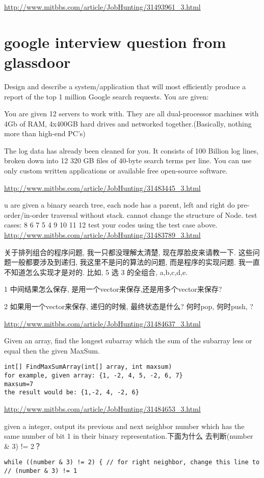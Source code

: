 \documentclass[12pt]{book}
\begin{document}
\url{http://www.mitbbs.com/article/JobHunting/31493961_3.html}
\chapter{google interview question from glassdoor}
\label{sec-16}
Design and describe a system/application that will most efficiently produce 
a report of the top 1 million Google search requests. You are given:

You are given 12 servers to work with. They are all dual-processor machines 
with 4Gb of RAM, 4x400GB hard drives and networked together.(Basically, 
nothing more than high-end PC's)

The log data has already been cleaned for you. It consists of 100 Billion 
log lines, broken down into 12 320 GB files of 40-byte search terms per line.
You can use only custom written applications or available free open-source 
software.

\url{http://www.mitbbs.com/article/JobHunting/31483445_3.html}

u are given a binary search tree,
each node has a parent, left and right
do pre-order/in-order traversal without stack.
cannot change the structure of Node.
test cases: 8  6  7  5  4  9  10  11  12
test your codes using the test case above.
\url{http://www.mitbbs.com/article/JobHunting/31483789_3.html}

关于排列组合的程序问题, 我一只都没理解太清楚, 现在厚脸皮来请教一下. 这些问题一般都要涉及到递归, 我这里不是问的算法的问题, 而是程序的实现问题. 我一直不知道怎么实现才是对的. 比如, 5 选 3 的全组合, a,b,c,d,e. 

1 中间结果怎么保存, 是用一个vector来保存,还是用多个vector来保存?

2 如果用一个vector来保存, 递归的时候, 最终状态是什么? 何时pop, 何时push, ?

\url{http://www.mitbbs.com/article/JobHunting/31484637_3.html}

Given an array, find the longest subarray which the sum of the
subarray less or equal then the given MaxSum.
\lstset{language=java,label= ,caption= ,numbers=none}
\begin{lstlisting}
int[] FindMaxSumArray(int[] array, int maxsum)
for example, given array: {1, -2, 4, 5, -2, 6, 7}
maxsum=7
the result would be: {1,-2, 4, -2, 6}
\end{lstlisting}

\url{http://www.mitbbs.com/article/JobHunting/31484653_3.html}

given a integer, output its previous and next neighbor number which
has the same number of bit 1 in their binary representation.下面为什么
去判断(number \& 3) != 2？
\lstset{language=java,label= ,caption= ,numbers=none}
\begin{lstlisting}
while ((number & 3) != 2) { // for right neighbor, change this line to 
// (number & 3) != 1
\end{lstlisting}
\end{document}
